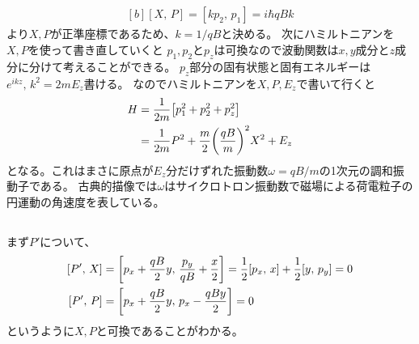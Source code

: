 \documentclass[../../master.tex]{subfiles}
\begin{document}
\subsection{}
\begin{equation}\begin{aligned}[b]
    [X,\,P] = [kp_2,\,p_1] = i\hbar qBk
\end{aligned}\end{equation}
より\(X,P\)が正準座標であるため、\(k=1/qB\)と決める。
次にハミルトニアンを\(X,P\)を使って書き直していくと
\(p_1,p_2\)と\(p_z\)は可換なので波動関数は\(x,y\)成分と\(z\)成分に分けて考えることができる。
\(p_z\)部分の固有状態と固有エネルギーは\(e^{ikz},\,k^2=2mE_z\)書ける。
なのでハミルトニアンを\(X,P,E_z\)で書いて行くと
\begin{equation}\begin{aligned}[b]
    H &= \frac{1}{2m}\qty[p_1^2 + p_2^2 +p_z^2]\\
    &= \frac{1}{2m}P^2 + \frac{m}{2}\qty(\frac{qB}{m})^2X^2 +E_z
\end{aligned}\end{equation}
となる。これはまさに原点が\(E_z\)分だけずれた振動数\(\omega = qB/m\)の1次元の調和振動子である。
古典的描像では\(\omega\)はサイクロトロン振動数で磁場による荷電粒子の円運動の角速度を表している。

\subsection{}
まず\(P'\)について、
\begin{equation}\begin{aligned}[b]
    [P',\,X] &= \qty[p_x+\frac{qB}{2}y,\,\frac{p_y}{qB}+\frac{x}{2}]
    = \frac{1}{2}[p_x,\,x]+\frac{1}{2}[y,\,p_y] =0\\
    [P',\,P] &= \qty[p_x+\frac{qB}{2}y,\,p_x-\frac{qBy}{2}] = 0
\end{aligned}\end{equation}
というように\(X,P\)と可換であることがわかる。
\end{document}
